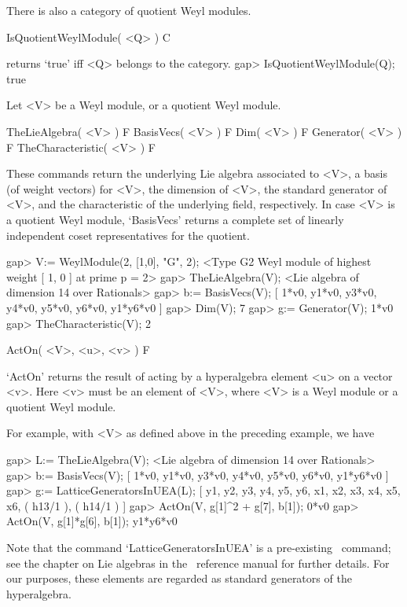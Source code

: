 There is also a category of quotient Weyl modules. 

\>IsQuotientWeylModule( <Q> ) C

returns `true' iff <Q> belongs to the category.
\beginexample
gap> IsQuotientWeylModule(Q);
true
\endexample



Let <V> be a Weyl module, or a quotient Weyl module. 

\>TheLieAlgebra( <V> ) F
\>BasisVecs( <V> ) F
\>Dim( <V> ) F
\>Generator( <V> ) F
\>TheCharacteristic( <V> ) F

These commands return the underlying Lie algebra associated to <V>, a
basis (of weight vectors) for <V>, the dimension of <V>, the standard
generator of <V>, and the characteristic of the underlying field,
respectively. In case <V> is a quotient Weyl module, `BasisVecs'
returns a complete set of linearly independent coset representatives
for the quotient.

\beginexample
gap> V:= WeylModule(2, [1,0], "G", 2);
<Type G2 Weyl module of highest weight [ 1, 0 ] at prime p = 2>
gap> TheLieAlgebra(V);
<Lie algebra of dimension 14 over Rationals>
gap> b:= BasisVecs(V);
[ 1*v0, y1*v0, y3*v0, y4*v0, y5*v0, y6*v0, y1*y6*v0 ]
gap> Dim(V);
7
gap> g:= Generator(V);
1*v0
gap> TheCharacteristic(V);
2
\endexample

\>ActOn( <V>, <u>, <v> ) F

`ActOn' returns the result of acting by a hyperalgebra element <u> on
a vector <v>. Here <v> must be an element of <V>, where <V> is a Weyl
module or a quotient Weyl module.

For example, with <V> as defined above in the preceding example, we have

\beginexample
gap> L:= TheLieAlgebra(V);
<Lie algebra of dimension 14 over Rationals>
gap> b:= BasisVecs(V);
[ 1*v0, y1*v0, y3*v0, y4*v0, y5*v0, y6*v0, y1*y6*v0 ]
gap> g:= LatticeGeneratorsInUEA(L);
[ y1, y2, y3, y4, y5, y6, x1, x2, x3, x4, x5, x6, ( h13/1 ), ( h14/1 ) ]
gap> ActOn(V, g[1]^2 + g[7], b[1]);
0*v0
gap> ActOn(V, g[1]*g[6], b[1]); 
y1*y6*v0
\endexample

Note that the command `LatticeGeneratorsInUEA' is a pre-existing \GAP\
command; see the chapter on Lie algebras in the \GAP\ reference manual
for further details. For our purposes, these elements are regarded as
standard generators of the hyperalgebra.



